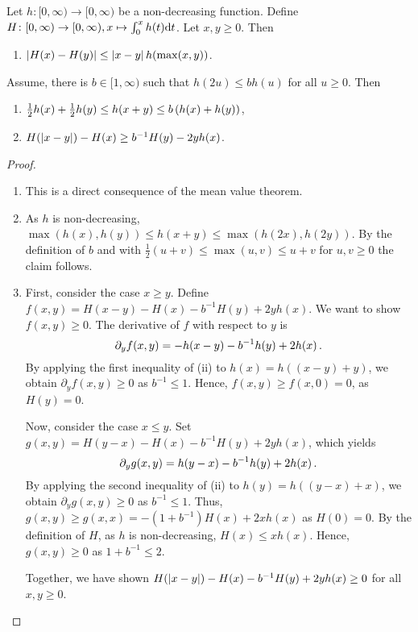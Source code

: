 \begin{lemma}\label{lmm:nondec}
Let $h \colon [0,\infty) \to [0,\infty)$ be a non-decreasing function.
Define $H \colon [0,\infty) \to [0,\infty), x\mapsto \int_0^x h(t) \mathrm{d} t$.
Let $x, y \geq 0$. Then
\begin{enumerate}[label=(\roman*)]
\item $\left| H(x) - H(y) \right| \leq \left| x-y \right|h(\max(x, y))$.
\end{enumerate}
Assume, there is $b \in [1,\infty)$ such that $h(2u) \leq b h(u)$ for all $u \geq 0$. Then
\begin{enumerate}[label=(\roman*),start=2]
\item $\frac12 h(x) + \frac12 h(y) \leq h (x+y) \leq b \left( h(x) + h(y) \right)$,
\item $H(\left| x-y \right|) - H(x) \geq b^{-1} H(y) - 2 y h(x)$.
\end{enumerate}
\end{lemma}
%
\begin{proof}
\begin{enumerate}[label=(\roman*)]
\item This is a direct consequence of the mean value theorem.
\item As $h$ is non-decreasing, $\max(h(x), h(y)) \leq h(x+y) \leq \max(h(2x), h(2y))$.
	By the definition of $b$ and with $\frac12(u+v) \leq \max(u,v) \leq u+v$ for $u,v \geq 0$ the claim follows.
\item 
	First, consider the case $x\geq y$.
 	Define $f(x,y) = H(x-y)-H(x)- b^{-1} H(y) + 2 y h(x)$.
 	We want to show $f(x, y)\geq0$.
	The derivative of $f$ with respect to $y$ is 
	\begin{equation*}
		\partial_y f(x, y) = -h(x-y) - b^{-1}h(y) + 2 h(x)\, .
	\end{equation*} 
	By applying the first inequality of (ii) to $h(x) = h((x-y) + y)$, we obtain $\partial_y f(x, y)  \geq 0$ as $b^{-1} \leq 1$.
	Hence, $f(x, y) \geq f(x, 0) = 0$, as $H(y) = 0$.
	
	Now, consider the case $x \leq y$. Set $g(x,y) = H(y-x) - H(x) - b^{-1} H(y) + 2 y h(x)$, which yields
	\begin{equation*}
		\partial_y g(x, y) = h(y-x) - b^{-1} h(y) + 2 h(x)\, .
	\end{equation*} 
	By applying the second inequality of (ii) to $h(y) = h((y-x) + x)$, we obtain $\partial_y g(x, y)  \geq 0$ as $b^{-1} \leq 1$.
	Thus, $g(x, y) \geq g(x, x) = -(1 + b^{-1}) H(x) + 2 x h(x)$ as $H(0) = 0$.
	By the definition of $H$, as $h$ is non-decreasing, $H(x) \leq x h(x)$. Hence, $g(x, y) \geq 0$ as $1 + b^{-1} \leq 2$.

	Together, we have shown $H(\left| x-y \right|) - H(x) - b^{-1} H(y) + 2 y h(x) \geq 0$ for all $x,y\geq0$.
\end{enumerate}
\end{proof}
